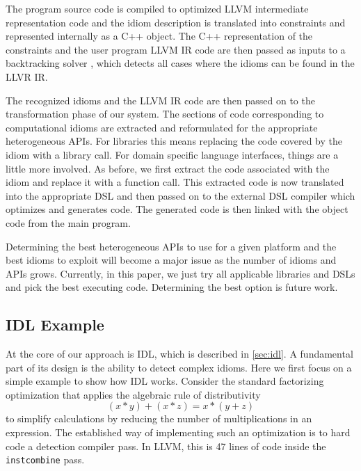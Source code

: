     The program source code is compiled to optimized LLVM intermediate
    representation code and the idiom description is translated into constraints
    and represented internally as a C++ object.
    The C++ representation of the constraints and the user program LLVM IR code
    are then passed as inputs to a backtracking solver
    \cite{ginsbach2017discovery}, which detects all cases where the idioms can
    be found in the LLVR IR.

    The recognized idioms and the LLVM IR code are then passed on
    to the transformation phase of our system.
    The sections of code corresponding to computational idioms are extracted
    and reformulated for the appropriate heterogeneous APIs.
    For libraries this means replacing
    the code covered by the idiom with a library call. 
    For domain specific language interfaces,
    things are a little more involved. As before, we first extract the code
    associated with the idiom and replace it with a function call. This
    extracted code is now translated into the appropriate DSL and then
    passed on to the external DSL compiler which optimizes and generates
    code. The generated code is then linked
    with the object code from the main program.

    Determining the best heterogeneous APIs to use for a given platform
    and the best idioms to exploit will become a major issue as the number
    of idioms and APIs grows.  Currently, in this paper, we just try all
    applicable libraries and DSLs and pick the best executing
    code. Determining the best option is future work.

\subsection{IDL Example}

    At the core of our approach is IDL, which is described in \autoref{sec:idl}.
    A fundamental part of its design is the
    ability to detect  complex idioms.  Here we first focus on a simple example
    to show how IDL works.  Consider the standard factorizing
    optimization that applies the algebraic rule of distributivity
    \[(x*y)+(x*z) = x*(y+z)\]
    to simplify calculations by reducing the number of multiplications in an
    expression.
    The established way of implementing such an optimization is to hard code a
    detection compiler pass.
    In LLVM, this is 47 lines of code inside the \texttt{instcombine} pass.

